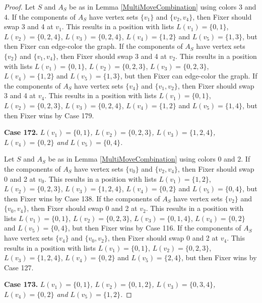 \documentclass[12pt]{amsart}
\theoremstyle{plain}
\theoremstyle{definition}
\theoremstyle{remark}
\begin{document}
\begin{proof}
Let $S$ and $A_S$ be as in Lemma \ref{MultiMoveCombination} using colors $3$ and $4$. If the components of $A_S$ have vertex sets $\{v_1\}$ and $\{v_2, v_4\}$, then Fixer should swap 3 and 4 at $v_1$. This results in a position with lists $L(v_1) = \{0, 1\}$, $L(v_2) = \{0, 2, 4\}$, $L(v_3) = \{0, 2, 4\}$, $L(v_4) = \{1, 2\}$ and $L(v_5) = \{1, 3\}$, but then Fixer can edge-color the graph.
If the components of $A_S$ have vertex sets $\{v_2\}$ and $\{v_1, v_4\}$, then Fixer should swap 3 and 4 at $v_2$. This results in a position with lists $L(v_1) = \{0, 1\}$, $L(v_2) = \{0, 2, 3\}$, $L(v_3) = \{0, 2, 3\}$, $L(v_4) = \{1, 2\}$ and $L(v_5) = \{1, 3\}$, but then Fixer can edge-color the graph.
If the components of $A_S$ have vertex sets $\{v_4\}$ and $\{v_1, v_2\}$, then Fixer should swap 3 and 4 at $v_4$. This results in a position with lists $L(v_1) = \{0, 1\}$, $L(v_2) = \{0, 2, 3\}$, $L(v_3) = \{0, 2, 4\}$, $L(v_4) = \{1, 2\}$ and $L(v_5) = \{1, 4\}$, but then Fixer wins by Case 179.

\noindent\textbf{Case 172.  }\textit{$L(v_1) = \{0, 1\}$, $L(v_2) = \{0, 2, 3\}$, $L(v_3) = \{1, 2, 4\}$, $L(v_4) = \{0, 2\}$ and $L(v_5) = \{0, 4\}$.}

Let $S$ and $A_S$ be as in Lemma \ref{MultiMoveCombination} using colors $0$ and $2$. If the components of $A_S$ have vertex sets $\{v_0\}$ and $\{v_2, v_4\}$, then Fixer should swap 0 and 2 at $v_0$. This results in a position with lists $L(v_1) = \{1, 2\}$, $L(v_2) = \{0, 2, 3\}$, $L(v_3) = \{1, 2, 4\}$, $L(v_4) = \{0, 2\}$ and $L(v_5) = \{0, 4\}$, but then Fixer wins by Case 138.
If the components of $A_S$ have vertex sets $\{v_2\}$ and $\{v_0, v_4\}$, then Fixer should swap 0 and 2 at $v_2$. This results in a position with lists $L(v_1) = \{0, 1\}$, $L(v_2) = \{0, 2, 3\}$, $L(v_3) = \{0, 1, 4\}$, $L(v_4) = \{0, 2\}$ and $L(v_5) = \{0, 4\}$, but then Fixer wins by Case 116.
If the components of $A_S$ have vertex sets $\{v_4\}$ and $\{v_0, v_2\}$, then Fixer should swap 0 and 2 at $v_4$. This results in a position with lists $L(v_1) = \{0, 1\}$, $L(v_2) = \{0, 2, 3\}$, $L(v_3) = \{1, 2, 4\}$, $L(v_4) = \{0, 2\}$ and $L(v_5) = \{2, 4\}$, but then Fixer wins by Case 127.

\noindent\textbf{Case 173.  }\textit{$L(v_1) = \{0, 1\}$, $L(v_2) = \{0, 1, 2\}$, $L(v_3) = \{0, 3, 4\}$, $L(v_4) = \{0, 2\}$ and $L(v_5) = \{1, 2\}$.}


\end{proof}
\end{document}

